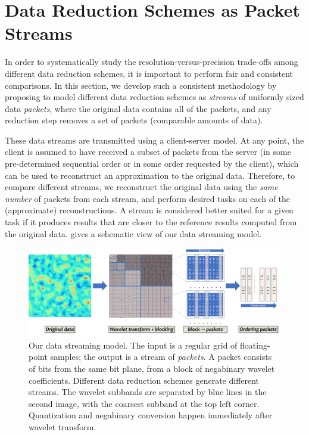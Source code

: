 \section{Data Reduction Schemes as Packet Streams}\label{sec:terminologies}

In order to systematically study the resolution-versus-precision trade-offs among different data
reduction schemes, it is important to perform fair and consistent comparisons. In this section, we
develop such a consistent methodology by proposing to model different data reduction schemes as
\emph{streams} of uniformly sized data \emph{packets}, where the original data contains all of the
packets, and any reduction step removes a set of packets (comparable amounts of data).

These data streams are transmitted using a client-server model. At any point, the client is assumed
to have received a subset of packets from the server (in some pre-determined sequential order or in
some order requested by the client), which can be used to reconstruct an approximation to the
original data. Therefore, to compare different streams, we reconstruct the original data using the
\emph{same number} of packets from each stream, and perform desired tasks on each of the
(approximate) reconstructions. A stream is considered better suited for a given task if it produces
results that are closer to the reference results computed from the original data.
 gives a schematic view of our data streaming model.

\begin{figure}[!b]
\vspace{-1em}
\centering
\includegraphics[width=\linewidth]{img/pipeline.png}
\vspace{-1em}
\caption{Our data streaming model. The input is a regular grid of floating-point samples;
the output is a stream of \emph{packets}. A packet consists of bits from the same bit plane, from a
block of negabinary wavelet coefficients. Different data reduction schemes generate different
streams.  The wavelet subbands are separated by blue lines in the second image, with the coarsest
subband at the top left corner. 
Quantization and negabinary conversion
happen immediately after wavelet transform.
}\label{fig:pipeline}
\end{figure}


